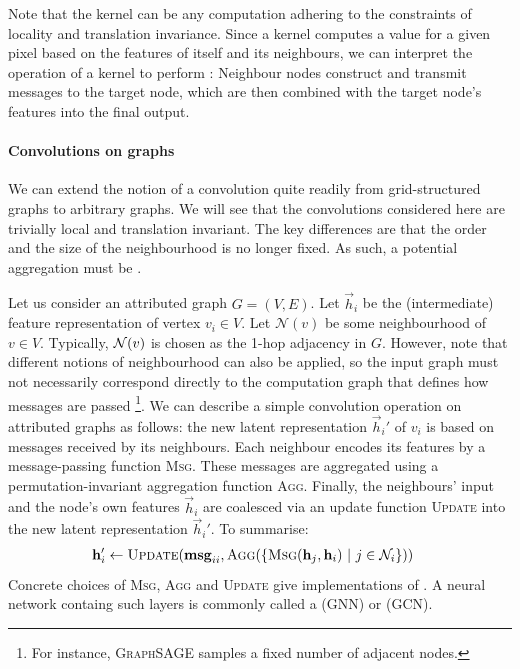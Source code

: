\documentclass[
	fontsize=10pt, %
	twoside=false, %
	secnumdepth=1, %
]{kaobook}
\begin{document}
Note that the kernel can be any
computation adhering to the constraints of locality and translation invariance.
Since a kernel computes a value for a given pixel based on the features of
itself and its neighbours, we can interpret the operation of a kernel to perform
: Neighbour nodes construct and transmit messages to the
target node, which are then combined with the target node's features into the
final output.


\paragraph{Convolutions on graphs} We can extend the notion of a convolution quite readily from grid-structured
graphs to arbitrary graphs. We will see that the convolutions considered here
are trivially local and translation invariant. The key differences are that the
order and the size of the neighbourhood is no longer fixed. As such, a potential
aggregation must be .

Let us consider an attributed graph $G=(V,E)$. Let $\vec h_i$ be the
(intermediate) feature representation of vertex $v_i \in V$. Let $\mathcal{N}(v)$
be some neighbourhood of $v \in V$. Typically, $\mathcal{N}(v)$ is chosen as the
1-hop adjacency in $G$. However, note that different notions of neighbourhood
can also be applied, so the input graph must not necessarily correspond directly
to the computation graph that defines how messages are passed \footnote{ For
  instance, \textsc{GraphSAGE}
  \cite{hamilton_InductiveRepresentationLearning_2018} samples a fixed number of
  adjacent nodes. }. We can describe a simple convolution operation on
attributed graphs as
follows: the new latent representation $\vec h_i'$ of $v_i$ is based on messages
received by its neighbours. Each neighbour encodes its features by a
message-passing function \textsc{Msg}. These messages are aggregated using a
permutation-invariant aggregation function \textsc{Agg}. Finally, the
neighbours' input and the node's own features $\vec h_i$ are coalesced via an
update function \textsc{Update} into the new latent representation $\vec h_i'$.
To summarise:
\begin{align}
  & \vec h_i' \gets \textsc{Update}(\vec{msg}_{ii}, \textsc{Agg}(\{\textsc{Msg}(\vec h_j, \vec h_i) ~|~ j \in \mathcal{N}_i\}))
    \label{eq:gnn-framework}
\end{align}
Concrete choices of \textsc{Msg}, \textsc{Agg} and \textsc{Update} give
implementations of . A neural network containg
such layers is commonly called a  (GNN) or  (GCN).
\end{document}
